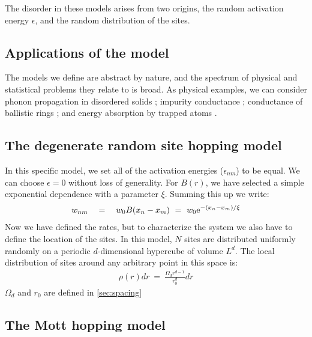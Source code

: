 The disorder in these models arises from two origins, 
the random activation energy $\epsilon$, and the random distribution of the sites.


\subsection{Applications of the model}


The models we define are abstract by nature, and
the spectrum of physical and statistical problems they
relate to is broad.
As physical examples, we can consider
phonon propagation in disordered solids 
\cite{nagel_normal-mode_1981,schirmacher_analogies_1992,amir_localization_2010,amir_mean-field_2008};
impurity conductance \cite{miller_impurity_1960,movaghar_theory_1981};
conductance of ballistic rings \cite{bandopadhyay_conductance_2006,*cohen_kubo_2007,*stotland_random-matrix_2010};
and energy absorption by trapped atoms \cite{stotland_semilinear_2009,*stotland_quantum_2010,*stotland_weak_2011}. 


\subsection{The degenerate random site hopping model} \label{sec:degenerate_random_hopping}

In this specific model, we set all of the activation energies ($\epsilon_{nm}$)
to be equal. We can choose $\epsilon=0$ without loss of generality. For $B(r)$, 
we have selected a simple exponential dependence with a parameter $\xi$.
Summing this up we write:
%
\begin{align}\label{eq:random_hopping_rates}
w_{nm} \quad = \quad w_0 B(x_n-x_m) \ = \ w_0 \mbox{e}^{-(x_n-x_m)/\xi}
\end{align}
%
Now we have defined the rates, but to characterize the system we also
have to define the location of the sites. In this model, $N$ sites are distributed
uniformly randomly on a periodic $d$-dimensional hypercube of volume $L^d$. The
local distribution of sites around any arbitrary point in this space is:
%
\begin{align}\label{eq:site_distribution}
\rho(r)dr \ =\ \frac{\Omega_d r^{d-1}}{r_0^d} dr
\end{align}
%
$\Omega_d$ and $r_0$ are defined in \autoref{sec:spacing}

\subsection{The Mott hopping model}\label{sec:mott_hopping}

